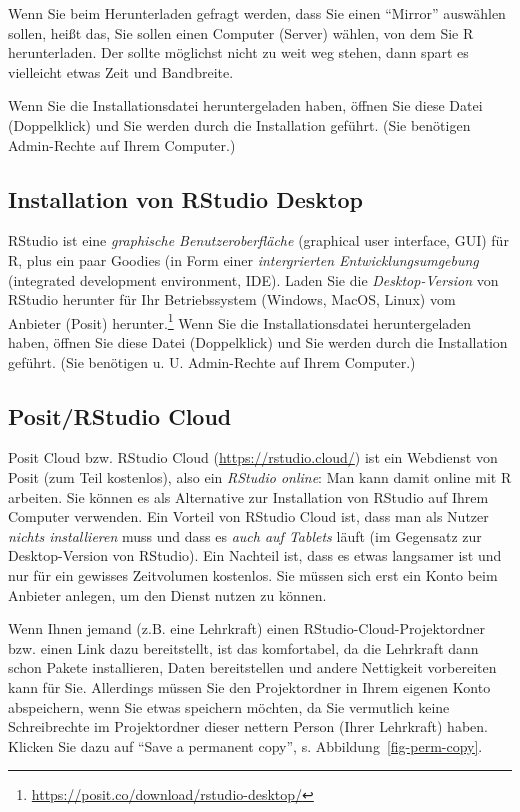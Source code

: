 \documentclass[
  letterpaper,
  twoside,
  open=any]{scrbook}
\theoremstyle{definition}
\theoremstyle{definition}
\theoremstyle{definition}
\theoremstyle{remark}
\begin{document}
Wenn Sie beim Herunterladen gefragt werden, dass Sie einen
\enquote{Mirror} auswählen sollen, heißt das, Sie sollen einen Computer
(Server) wählen, von dem Sie R herunterladen. Der sollte möglichst nicht
zu weit weg stehen, dann spart es vielleicht etwas Zeit und Bandbreite.

Wenn Sie die Installationsdatei heruntergeladen haben, öffnen Sie diese
Datei (Doppelklick) und Sie werden durch die Installation geführt. (Sie
benötigen Admin-Rechte auf Ihrem Computer.)

\subsection{Installation von RStudio
Desktop}\label{installation-von-rstudio-desktop}

RStudio ist eine \emph{graphische Benutzeroberfläche} (graphical user
interface, GUI) für R, plus ein paar Goodies (in Form einer
\emph{intergrierten Entwicklungsumgebung} (integrated development
environment, IDE). Laden Sie die \emph{Desktop-Version} von RStudio
herunter für Ihr Betriebssystem (Windows, MacOS, Linux) vom Anbieter
(Posit) herunter.\footnote{\url{https://posit.co/download/rstudio-desktop/}}
Wenn Sie die Installationsdatei heruntergeladen haben, öffnen Sie diese
Datei (Doppelklick) und Sie werden durch die Installation geführt. (Sie
benötigen u. U. Admin-Rechte auf Ihrem Computer.)

\subsection{Posit/RStudio Cloud}\label{positrstudio-cloud}

Posit Cloud bzw. RStudio Cloud (\url{https://rstudio.cloud/}) ist ein
Webdienst von Posit (zum Teil kostenlos), also ein \emph{RStudio
online}: Man kann damit online mit R arbeiten. Sie können es als
Alternative zur Installation von RStudio auf Ihrem Computer verwenden.
Ein Vorteil von RStudio Cloud ist, dass man als Nutzer \emph{nichts
installieren} muss und dass es \emph{auch auf Tablets} läuft (im
Gegensatz zur Desktop-Version von RStudio). Ein Nachteil ist, dass es
etwas langsamer ist und nur für ein gewisses Zeitvolumen kostenlos. Sie
müssen sich erst ein Konto beim Anbieter anlegen, um den Dienst nutzen
zu können.

Wenn Ihnen jemand (z.B. eine Lehrkraft) einen
RStudio-Cloud-Projektordner bzw. einen Link dazu bereitstellt, ist das
komfortabel, da die Lehrkraft dann schon Pakete installieren, Daten
bereitstellen und andere Nettigkeit vorbereiten kann für Sie. Allerdings
müssen Sie den Projektordner in Ihrem eigenen Konto abspeichern, wenn
Sie etwas speichern möchten, da Sie vermutlich keine Schreibrechte im
Projektordner dieser nettern Person (Ihrer Lehrkraft) haben. Klicken Sie
dazu auf \enquote{Save a permanent copy}, s.
Abbildung~\ref{fig-perm-copy}.
\end{document}
